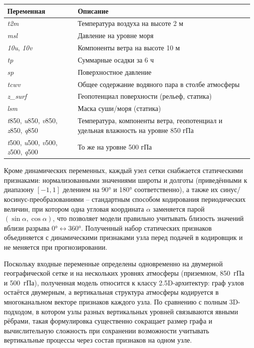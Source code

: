 \documentclass[14pt,a4paper]{extarticle}
\newcounter{none}
\numberwithin{table}{section}
\numberwithin{figure}{section}
\numberwithin{equation}{section}
\begin{document}
{\def\LTcaptype{none} %
\begin{longtable}[]{@{}
  >{\raggedright\arraybackslash}p{}
  >{\raggedright\arraybackslash}p{}@{}}
\toprule\noalign{}
\begin{minipage}[b]{\linewidth}\raggedright
Переменная
\end{minipage} & \begin{minipage}[b]{\linewidth}\raggedright
Описание
\end{minipage} \\
\midrule\noalign{}
\endhead
\bottomrule\noalign{}
\endlastfoot
\emph{t2m} & Температура воздуха на высоте 2 м \\
\emph{msl} & Давление на уровне моря \\
\emph{10u}, \emph{10v} & Компоненты ветра на высоте 10 м \\
\emph{tp} & Суммарные осадки за 6 ч \\
\emph{sp} & Поверхностное давление \\
\emph{tcwv} & Общее содержание водяного пара в столбе атмосферы \\
\emph{z\_surf} & Геопотенциал поверхности (рельеф, статика) \\
\emph{lsm} & Маска суши/моря (статика) \\
\emph{t}850, \emph{u}850, \emph{v}850, \emph{z}850, \emph{q}850 &
Температура, компоненты ветра, геопотенциал и удельная влажность на
уровне 850 гПа \\
\emph{t}500, \emph{u}500, \emph{v}500, \emph{z}500, \emph{q}500 &
То же на уровне 500 гПа \\
\end{longtable}
}

Кроме динамических переменных, каждый узел сетки снабжается
статическими признаками: нормализованными значениями широты
и долготы (приведёнными к диапазону \([-1, 1]\) делением на 90° и 180°
соответственно), а также их синус/косинус-преобразованиями --
стандартным способом кодирования периодических величин, при котором
одна угловая координата \(\alpha\) заменяется парой \((\sin\alpha,
\cos\alpha)\), что позволяет модели правильно учитывать близость
значений вблизи разрыва \(0° \leftrightarrow 360°\). Полученный набор
статических признаков объединяется с динамическими признаками узла
перед подачей в кодировщик и не меняется при прогнозировании.

Поскольку входные переменные определены одновременно на двумерной
географической сетке и на нескольких уровнях атмосферы (приземном,
850~гПа и 500~гПа), полученная модель относится к классу
2.5D-архитектур: граф узлов остаётся двумерным, а вертикальная
структура атмосферы кодируется в многоканальном векторе признаков
каждого узла. По сравнению с полным 3D-подходом, в котором узлы разных
вертикальных уровней связываются явными рёбрами, такая формулировка
существенно сокращает размер графа и вычислительную сложность при
сохранении возможности учитывать вертикальные процессы через состав
признаков на одном узле.
\end{document}
